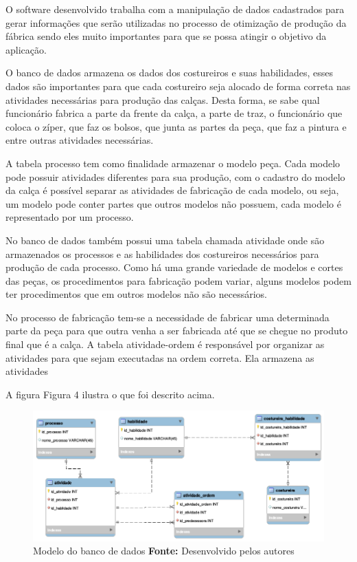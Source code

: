 \par O software desenvolvido trabalha com a manipulação de dados cadastrados
para gerar informações que serão utilizadas no processo  de otimização de
produção da fábrica sendo eles muito importantes para que se possa atingir o
objetivo da aplicação. 

\par O banco de dados armazena os dados dos costureiros e suas habilidades,
esses dados são importantes para que cada costureiro seja alocado de forma
correta nas atividades necessárias para produção das calças. Desta forma, se
sabe qual funcionário fabrica a parte da frente da calça, a parte de traz, o
funcionário que coloca o zíper, que faz os bolsos, que junta as partes da peça,
que faz a pintura e entre outras atividades necessárias.

\par A tabela processo tem como finalidade armazenar o modelo peça. Cada
modelo pode possuir atividades diferentes para sua produção, com o cadastro
do modelo da calça é possível separar as atividades de fabricação de cada
modelo, ou seja, um modelo pode conter partes que outros modelos não possuem,
cada modelo é representado por um processo.

\par No banco de dados também possui uma tabela chamada atividade onde são
armazenados os processos e as habilidades dos costureiros necessários para
produção de cada processo.
Como há uma grande variedade de modelos e cortes das peças, os procedimentos
para fabricação podem variar, alguns modelos podem ter procedimentos que em outros
modelos não são necessários.

\par No processo de fabricação tem-se a necessidade de fabricar uma
determinada parte da peça para que outra venha a ser fabricada até que se chegue
no produto final que é a calça. A tabela atividade-ordem é responsável por
organizar as atividades para que sejam executadas na ordem correta. Ela
armazena as atividades 

\par A figura Figura 4 ilustra o que foi descrito acima.

\begin{figure}[h!]
	\centerline{\includegraphics[scale=0.6]{./imagens/model_tcc.png}}
	\caption[Modelo do banco de dados]
	{Modelo do banco de dados \textbf{Fonte:} Desenvolvido pelos autores}
	\label{fig:exemplo1}
\end{figure}

